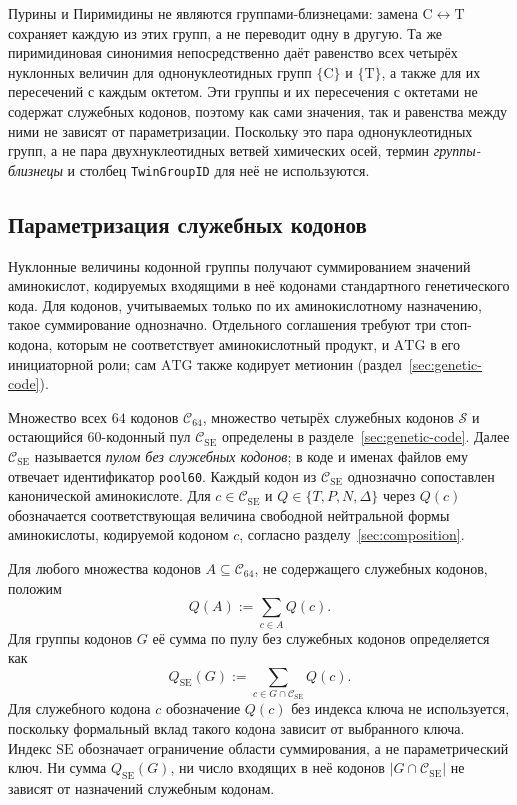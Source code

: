 \documentclass[11pt,a4paper]{article}
\renewcommand{\_}{\origunderscore\allowbreak}
\begin{document}
Пурины и Пиримидины не являются группами-близнецами: замена
$\mathrm{C}\leftrightarrow\mathrm{T}$ сохраняет каждую из этих групп,
а не переводит одну в другую. Та же пиримидиновая синонимия
непосредственно даёт равенство всех четырёх нуклонных величин для
однонуклеотидных групп $\{\mathrm{C}\}$ и $\{\mathrm{T}\}$, а также
для их пересечений с каждым октетом. Эти группы и их пересечения с
октетами не содержат служебных кодонов, поэтому как сами значения, так
и равенства между ними не зависят от параметризации. Поскольку это
пара однонуклеотидных групп, а не пара двухнуклеотидных ветвей
химических осей, термин \emph{группы-близнецы} и столбец
\texttt{Twin\_Group\_ID} для неё не используются.

\subsection{Параметризация служебных кодонов}
\label{sec:parametrization}

Нуклонные величины кодонной группы получают суммированием значений
аминокислот, кодируемых входящими в неё кодонами стандартного
генетического кода. Для кодонов, учитываемых только по их
аминокислотному назначению, такое суммирование однозначно. Отдельного
соглашения требуют три стоп-кодона, которым не соответствует
аминокислотный продукт, и $\mathrm{ATG}$ в его инициаторной роли;
сам $\mathrm{ATG}$ также кодирует метионин
(раздел~\ref{sec:genetic-code}).

Множество всех $64$ кодонов $\mathcal{C}_{64}$, множество четырёх
служебных кодонов $\mathcal{S}$ и остающийся 60-кодонный пул
$\mathcal{C}_{\mathrm{SE}}$ определены в
разделе~\ref{sec:genetic-code}. Далее $\mathcal{C}_{\mathrm{SE}}$
называется \emph{пулом без служебных кодонов}; в коде и именах файлов
ему отвечает идентификатор \texttt{pool60}.
Каждый кодон из $\mathcal{C}_{\mathrm{SE}}$ однозначно сопоставлен
канонической аминокислоте. Для
$c\in\mathcal{C}_{\mathrm{SE}}$ и
$Q\in\{T,P,N,\Delta\}$ через $Q(c)$ обозначается соответствующая
величина свободной нейтральной формы аминокислоты, кодируемой кодоном
$c$, согласно разделу~\ref{sec:composition}.

Для любого множества кодонов
$A\subseteq\mathcal{C}_{64}$, не содержащего служебных кодонов,
положим
\[
Q(A):=\sum_{c\in A}Q(c).
\]
Для группы кодонов $G$ её сумма по пулу без служебных кодонов
определяется как
\[
Q_{\mathrm{SE}}(G)
:=
\sum_{c\in G\cap\mathcal{C}_{\mathrm{SE}}}Q(c).
\]
Для служебного кодона $c$ обозначение $Q(c)$ без индекса ключа не
используется, поскольку формальный вклад такого кодона зависит от
выбранного ключа. Индекс
$\mathrm{SE}$ обозначает ограничение области суммирования, а не
параметрический ключ. Ни сумма $Q_{\mathrm{SE}}(G)$, ни число входящих
в неё кодонов $|G\cap\mathcal{C}_{\mathrm{SE}}|$ не зависят от
назначений служебным кодонам.
\end{document}
